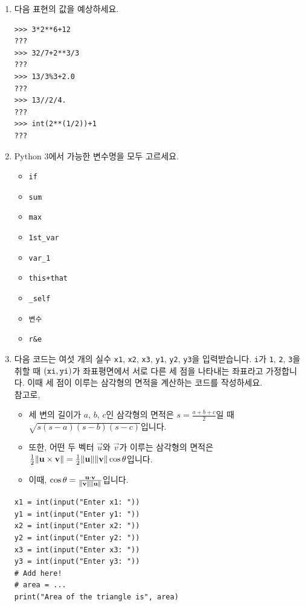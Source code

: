 \documentclass[../main.tex]{subfiles}
\begin{document}
\begin{enumerate}
  \item 다음 표현의 값을 예상하세요.
    \begin{verbatim}
>>> 3*2**6+12
???
>>> 32/7+2**3/3
???
>>> 13/3%3+2.0
???
>>> 13//2/4.
???
>>> int(2**(1/2))+1
???
    \end{verbatim}

  \item Python 3에서 가능한 변수명을 모두 고르세요.
    \begin{itemize}
      \item \texttt{if}
      \item \texttt{sum}
      \item \texttt{max}
      \item \texttt{1st\_var}
      \item \texttt{var\_1}
      \item \texttt{this+that}
      \item \texttt{\_self}
      \item \texttt{변수}
      \item \texttt{r\&e}
    \end{itemize}

  \item 다음 코드는 여섯 개의 실수 \verb|x1|, \verb|x2|, \verb|x3|, \verb|y1|,
    \verb|y2|, \verb|y3|을 입력받습니다.
    \verb|i|가 \verb|1|, \verb|2|, \verb|3|을 취할 때 $(\verb|xi|,
    \verb|yi|)$가 좌표평면에서 서로 다른 세 점을 나타내는 좌표라고 가정합니다.
    이때 세 점이 이루는 삼각형의 면적을 계산하는 코드를 작성하세요.\\
    참고로,
    \begin{itemize}
      \small
      \item 세 변의 길이가 $a$, $b$, $c$인 삼각형의 면적은 $s = \frac{a + b +
        c}{2}$일 때 $\sqrt{s(s - a)(s - b)(s - c)}$입니다.
      \item 또한, 어떤 두 벡터 $\vec{u}$와 $\vec{v}$가 이루는 삼각형의 면적은
        $\frac12 \norm{\mathbf{u} \times \mathbf{v}} = \frac12 \norm{\mathbf{u}}
        \norm{\mathbf{v}} \cos \theta$입니다.
      \item 이때, $\cos \theta = \frac{\mathbf{u} \cdot \mathbf{v}}{\norm{\mathbf{v}}
    \norm{\mathbf{u}}}$입니다.
    \end{itemize}
    \begin{verbatim}
x1 = int(input("Enter x1: "))
y1 = int(input("Enter y1: "))
x2 = int(input("Enter x2: "))
y2 = int(input("Enter y2: "))
x3 = int(input("Enter x3: "))
y3 = int(input("Enter y3: "))
# Add here!
# area = ...
print("Area of the triangle is", area)
    \end{verbatim}


\end{enumerate}
\end{document}
